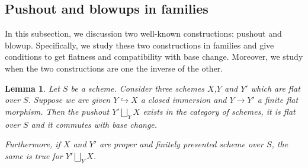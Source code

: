 \documentclass{alggeom}
\numberwithin{equation}{section}
\numberwithin{subsection}{section}
\newtheorem{lemma}[theorem]{Lemma}
\theoremstyle{definition}
\theoremstyle{remark}
\begin{document}
\subsection{Pushout and blowups in families}

In this subsection, we discussion two well-known constructions: pushout and blowup. Specifically, we study these two constructions in families and give conditions to get flatness and compatibility with base change. Moreover, we study when the two constructions are one the inverse of the other.

\begin{lemma}\label{lem:pushout}
	Let $S$ be a scheme. Consider three schemes $X$,$Y$ and $Y'$ which are flat over $S$. Suppose we are given $Y\hookrightarrow X$ a closed immersion and $Y\rightarrow Y'$ a finite flat morphism. Then the pushout $Y'\bigsqcup_Y X$ exists in the category of schemes, it is flat over $S$ and it commutes with base change. 
	
	Furthermore, if $X$ and $Y'$ are proper and finitely presented scheme over $S$, the same is true for $Y' \bigsqcup_Y X$.
\end{lemma}
\end{document}

